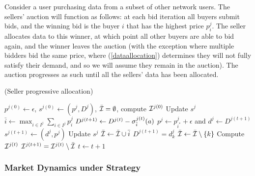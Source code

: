 Consider a user purchasing data from a subset of other network users.
The sellers' auction will function as follows: at each bid iteration all buyers
submit bids, and the winning bid is the buyer $i$ that has the highest price
$p_i^j$. The seller allocates
data to this winner, at which point all other buyers are able to bid again, and
the winner leaves the auction (with the exception where multiple bidders bid
the same price, where (\ref{dataallocation}) determines they will not fully
satisfy their demand, and so we will assume they remain in the auction). The auction progresses as such until all the
sellers' data has been allocated. 
\begin{center}
\begin{algorithm}[H]
\caption{(Seller progressive allocation)}
\begin{algorithmic}[1]
\State $p^{j(0)} \gets \epsilon$, $s^{j(0)} \gets (p^j, D^j)$, $\bar{\mathcal{I}} =
\emptyset$, compute
$\mathcal{I}^{j(0)}$
\State Update $s^j$ 
\State $\bar{i} \gets \displaystyle\max_{i\in I^j}\sum_{i\in I^j} p_i^j$ 
\State $D^{j(t+1)} \gets D^{j(t)} - \sigma_{\bar{i}}^{j(t)}(a)$
\State $p^j \gets p_{i^*}^j+\epsilon$ and $d^j \gets D^{j(t+1)}$
\State $s^{j(t+1)} \gets (d^j, p^j)$
\State Update $s^j$
\State $\bar{\mathcal{I}} \gets \bar{\mathcal{I}} \cup \bar{i}$
\State $D^{j(t+1)} = d_k^{j}$
\State $\bar{\mathcal{I}} \gets \bar{\mathcal{I}} \setminus \lbrace k \rbrace$
\EndIf
\EndFor
\State Compute $\mathcal{I}^{j(t)}$
\State $\mathcal{I}^{j(t+1)} = \mathcal{I}^{j(t)}\setminus \bar{\mathcal{I}}$
\State $t \gets t+1$
\EndWhile
\end{algorithmic}
\end{algorithm}
\end{center}

\subsubsection{Market Dynamics under Strategy}

